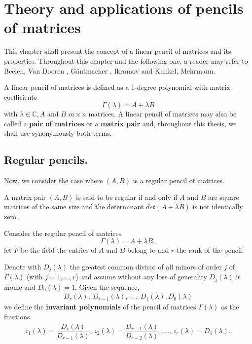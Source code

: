 \section{Theory and applications of pencils of matrices}
This chapter shall present the concept of a linear pencil of matrices and its properties. Throughout this
chapter and the following one, a reader may refer to Beelen, Van Dooren \cite{beelen-van_dooren}, G\"antmacher \cite{gantmacher},
Ikramov \cite{ikramov} and Kunkel, Mehrmann.
\cite{kunkel-mehrmann}
\begin{definition}
    A linear pencil of matrices is defined as a 1-degree polynomial with matrix coefficients
    \[
        \Gamma(\lambda) = A + \lambda B
    \]
    with \(\lambda \in \mathbb{C}, A\) and \(B\) \(m \times n\) matrices.
    A linear pencil of matrices may also be called a \textbf{pair of matrices} or a \textbf{matrix pair} and,
    throughout this thesis, we shall use synonymously both terms.
\end{definition}

\subsection*{Regular pencils.}
Now, we consider the case where \((A, B)\) is a regular pencil of matrices.
\begin{definition}\cite[p. 25, Definition 2]{gantmacher}
    A matrix pair \((A, B)\) is said to be regular if and only if \(A\) and \(B\) are square matrices of the same size and
    the determinant \(det(A + \lambda B)\) is not identically zero.
\end{definition}

Consider the regular pencil of matrices
\[\Gamma(\lambda) = A + \lambda B,\]
let \(F\) be the field the entries of \(A\) and \(B\) belong to and \(r\) the rank of the pencil.

Denote with \(D_{j}(\lambda)\) the greatest common divisor of all minors of order \(j\) of \(\Gamma(\lambda)\)
(with \(j = 1, ..., r\)) and assume without any loss of generality \(D_{j}(\lambda)\) is monic and
\(D_{0}(\lambda) = 1\). Given the sequence,
\begin{gather*}
    D_{r}(\lambda), \
    D_{r-1}(\lambda), \
    ..., \
    D_{1}(\lambda), D_{0}(\lambda)
\end{gather*}
we define the \textbf{invariant polynomials} \cite[p. 26]{gantmacher} of the pencil of matrices
\(\Gamma(\lambda)\) as the fractions
\begin{gather*}
    i_{1}(\lambda) = \dfrac{D_{r}(\lambda)}{D_{r-1}(\lambda)}, \
    i_{2}(\lambda) = \dfrac{D_{r-1}(\lambda)}{D_{r-2}(\lambda)}, \
    ..., \
    i_{r}(\lambda) = D_{1}(\lambda).
\end{gather*}


